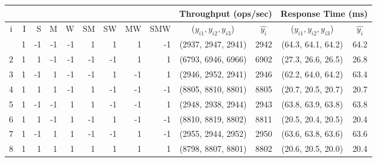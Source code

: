 \begin{tabular}{|c|rrrrrrrr|c|c|c|c|}
       \cline{10-13}
       \multicolumn{9}{c}{} & \multicolumn{2}{|c}{\textbf{Throughput} (ops/sec)} & \multicolumn{2}{|c|}{\textbf{Response Time} (ms)}\TBstrut\\
       \hline
       i & \hphantom{-}I\hphantom{-} & \hphantom{-}S\hphantom{-} & \hphantom{-}M\hphantom{-} &\hphantom{-}W\hphantom{-} & SM & SW & MW & SMW & ($y_{i1}, y_{i2}, y_{i3}$) & $\hat{y_i}$  & ($y_{i1}, y_{i2}, y_{i3}$) & $\hat{y_i}$\TBstrut\\
       \hline
   \Tstrut 1 & 1\hphantom{-} & -1\hphantom{-} & -1\hphantom{-} & -1\hphantom{--} & 1\hphantom{--} & 1\hphantom{--} & 1\hphantom{--} & -1\hphantom{---} & (2937, 2947, 2941) & 2942 & (64.3, 64.1, 64.2) & 64.2 \\
   2 & 1\hphantom{-} & 1\hphantom{-} & -1\hphantom{-} & -1\hphantom{--} & -1\hphantom{--} & -1\hphantom{--} & 1\hphantom{--} & 1\hphantom{---} & (6793, 6946, 6966) & 6902 & (27.3, 26.6, 26.5) & 26.8 \\
   3 & 1\hphantom{-} & -1\hphantom{-} & 1\hphantom{-} & -1\hphantom{--} & -1\hphantom{--} & 1\hphantom{--} & -1\hphantom{--} & 1\hphantom{---} & (2946, 2952, 2941) & 2946 & (62.2, 64.0, 64.2) & 63.4 \\
   4 & 1\hphantom{-} & 1\hphantom{-} & 1\hphantom{-} & -1\hphantom{--} & 1\hphantom{--} & -1\hphantom{--} & -1\hphantom{--} & -1\hphantom{---} & (8805, 8810, 8801) & 8805 & (20.7, 20.5, 20.7) & 20.7 \\
   5 & 1\hphantom{-} & -1\hphantom{-} & -1\hphantom{-} & 1\hphantom{--} & 1\hphantom{--} & -1\hphantom{--} & -1\hphantom{--} & 1\hphantom{---} & (2948, 2938, 2944) & 2943 & (63.8, 63.9, 63.8) & 63.8 \\
   6 & 1\hphantom{-} & 1\hphantom{-} & -1\hphantom{-} & 1\hphantom{--} & -1\hphantom{--} & 1\hphantom{--} & -1\hphantom{--} & -1\hphantom{---} & (8810, 8819, 8802) & 8811 & (20.5, 20.4, 20.5) & 20.4 \\
   7 & 1\hphantom{-} & -1\hphantom{-} & 1\hphantom{-} & 1\hphantom{--} & -1\hphantom{--} & -1\hphantom{--} & 1\hphantom{--} & -1\hphantom{---} & (2955, 2944, 2952) & 2950 & (63.6, 63.8, 63.6) & 63.6 \\
   8 & 1\hphantom{-} & 1\hphantom{-} & 1\hphantom{-} & 1\hphantom{--} & 1\hphantom{--} & 1\hphantom{--} & 1\hphantom{--} & 1\hphantom{---} & (8798, 8807, 8801) & 8802 & (20.6, 20.5, 20.0) & 20.4 \\
   \hline
    \end{tabular}